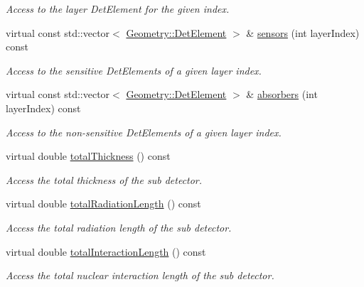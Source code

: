 \begin{DoxyCompactItemize}
\begin{DoxyCompactList}\small\item\em Access to the layer Det\+Element for the given index. \end{DoxyCompactList}\item 
virtual const std\+::vector$<$ \hyperlink{class_d_d4hep_1_1_geometry_1_1_det_element}{Geometry\+::\+Det\+Element} $>$ \& \hyperlink{class_d_d4hep_1_1_d_d_rec_1_1_layering_extension_impl_a3869b997ee9ebc7f63bef3ad50000a6a}{sensors} (int layer\+Index) const
\begin{DoxyCompactList}\small\item\em Access to the sensitive Det\+Elements of a given layer index. \end{DoxyCompactList}\item 
virtual const std\+::vector$<$ \hyperlink{class_d_d4hep_1_1_geometry_1_1_det_element}{Geometry\+::\+Det\+Element} $>$ \& \hyperlink{class_d_d4hep_1_1_d_d_rec_1_1_layering_extension_impl_a693de8a0ae4873d4d1a7abc7a6e2afce}{absorbers} (int layer\+Index) const
\begin{DoxyCompactList}\small\item\em Access to the non-\/sensitive Det\+Elements of a given layer index. \end{DoxyCompactList}\item 
virtual double \hyperlink{class_d_d4hep_1_1_d_d_rec_1_1_layering_extension_impl_a8981b8aa172e91e8a3f1fa490030a06c}{total\+Thickness} () const
\begin{DoxyCompactList}\small\item\em Access the total thickness of the sub detector. \end{DoxyCompactList}\item 
virtual double \hyperlink{class_d_d4hep_1_1_d_d_rec_1_1_layering_extension_impl_a69e58dff3608dc58cab88f9542b9317e}{total\+Radiation\+Length} () const
\begin{DoxyCompactList}\small\item\em Access the total radiation length of the sub detector. \end{DoxyCompactList}\item 
virtual double \hyperlink{class_d_d4hep_1_1_d_d_rec_1_1_layering_extension_impl_ad90a8ec4d00d9aff220e9091d822a009}{total\+Interaction\+Length} () const
\begin{DoxyCompactList}\small\item\em Access the total nuclear interaction length of the sub detector. \end{DoxyCompactList}\item 

\end{DoxyCompactItemize}
